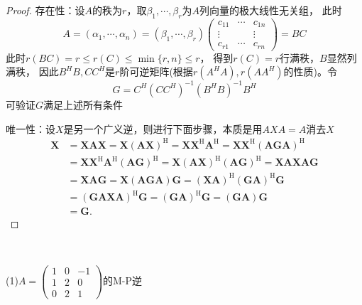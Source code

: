 \begin{proof}
  存在性：设$A$的秩为$r$，取$\beta_1,\cdots,\beta_r$为$A$列向量的极大线性无关组，
  此时
  \begin{equation*}
    A = (\alpha_1,\cdots,\alpha_n) = (\beta_1,\cdots,\beta_r) \left(
      \begin{array}{ccc}
        c_{11}&\cdots&c_{1n} \\
              \vdots&&\vdots \\
              c_{r1}&\cdots&c_{rn}
      \end{array}
    \right) = BC
  \end{equation*}
  此时$r(BC) = r \leq r(C) \leq \min\{r,n\} \leq r$，
  得到$r(C) = r$行满秩，$B$显然列满秩，
  因此$B^HB, CC^H$是$r$阶可逆矩阵(根据$r(A^HA), r(AA^H)$的性质)。令
  \begin{equation*}
    G = C^H(CC^H)^{-1}(B^HB)^{-1}B^H
  \end{equation*}
  可验证$G$满足上述所有条件

  唯一性：设$X$是另一个广义逆，则进行下面步骤，本质是用$AXA = A$消去$X$
  \begin{align*}
\boldsymbol{X} &=\boldsymbol{X} \boldsymbol{A} \boldsymbol{X}=\boldsymbol{X}(\boldsymbol{A} \boldsymbol{X})^{\mathrm{H}}=\boldsymbol{X} \boldsymbol{X}^{\mathrm{H}} \boldsymbol{A}^{\mathrm{H}}=\boldsymbol{X} \boldsymbol{X}^{\mathrm{H}}(\boldsymbol{A} \boldsymbol{G} \boldsymbol{A})^{\mathrm{H}} \\
&=\boldsymbol{X} \boldsymbol{X}^{\mathrm{H}} \boldsymbol{A}^{\mathrm{H}}(\boldsymbol{A} \boldsymbol{G})^{\mathrm{H}}=\boldsymbol{X}(\boldsymbol{A} \boldsymbol{X})^{\mathrm{H}}(\boldsymbol{A} \boldsymbol{G})^{\mathrm{H}}=\boldsymbol{X} \boldsymbol{A} \boldsymbol{X} \boldsymbol{A} \boldsymbol{G} \\
&=\boldsymbol{X} \boldsymbol{A} \boldsymbol{G}=\boldsymbol{X}(\boldsymbol{A} \boldsymbol{G} \boldsymbol{A}) \boldsymbol{G}=(\boldsymbol{X} \boldsymbol{A})^{\mathrm{H}}(\boldsymbol{G} \boldsymbol{A})^{\mathrm{H}} \boldsymbol{G} \\
&=(\boldsymbol{G} \boldsymbol{A} \boldsymbol{X} \boldsymbol{A})^{\mathrm{H}} \boldsymbol{G}=(\boldsymbol{G} \boldsymbol{A})^{\mathrm{H}} \boldsymbol{G}=(\boldsymbol{G} \boldsymbol{A}) \boldsymbol{G} \\
&=\boldsymbol{G} .
\end{align*}
\end{proof}

~

\begin{exercise}[计算M-P逆]
  (1)$A = \left(
    \begin{array}{ccc}
      1&0&-1 \\
       1&2&0 \\
       0&2&1
    \end{array}
  \right)$的M-P逆
\end{exercise}

